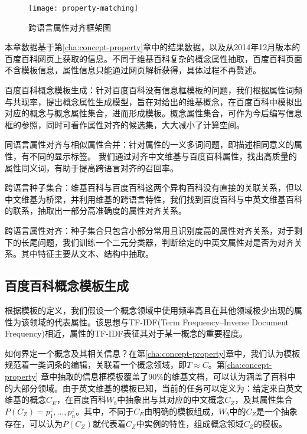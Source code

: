 \begin{figure}[h]
  \centering
  \texttt{[image: property-matching]}
  \caption{跨语言属性对齐框架图}
  \label{fig:property-matching}
\end{figure}

本章数据基于第\ref{cha:concept-property}章中的结果数据，以及从2014年12月版本的百度百科网页上获取的信息。不同于维基百科复杂的概念属性抽取，百度百科页面不含模板信息，属性信息只能通过网页解析获得，具体过程不再赘述。

{\heiti 百度百科概念模板生成：}针对百度百科没有信息框模板的问题，我们根据属性词频与共现率，提出概念属性生成模型，旨在对给出的维基概念，在百度百科中模拟出对应的概念与概念属性集合，进而形成模板。概念属性集合，可作为今后编写信息框的参照，同时可看作属性对齐的候选集，大大减小了计算空间。

{\heiti 同语言属性对齐与相似属性合并：}针对属性的一义多词问题，即描述相同意义的属性，有不同的显示标签。
我们通过对齐中文维基与百度百科属性，找出高质量的属性同义词，有助于提高跨语言对齐的召回率。

{\heiti 跨语言种子集合：}维基百科与百度百科这两个异构百科没有直接的关联关系，但以中文维基为桥梁，并利用维基的跨语言特性，我们找到百度百科与中英文维基百科的联系，抽取出一部分高准确度的属性对齐关系。

{\heiti 跨语言属性对齐：}种子集合只包含小部分常用且识别度高的属性对齐关系，对于剩下的长尾问题，我们训练一个二元分类器，判断给定的中英文属性对是否为对齐关系。其中特征主要从文本、结构中抽取。

\subsection{百度百科概念模板生成}
\label{sec:domain-template}
根据模板的定义，我们假设一个概念领域中使用频率高且在其他领域极少出现的属性为该领域的代表属性。该思想与TF-IDF(Term Frequency–Inverse Document Frequency)相近，属性的TF-IDF表征其对于某一概念的重要程度。

如何界定一个概念及其相关信息？在第\ref{cha:concept-property}章中，我们认为模板规范着一类词条的编辑，关联着一个概念领域，即$T \approx C$。第\ref{cha:concept-property} 章中抽取的信息框模板覆盖了90\%的维基文档，可以认为涵盖了百科中的大部分领域。由于英文维基的模板已知，当前的任务可以定义为：给定来自英文维基的概念$C_E$，在百度百科$W_b$中抽象出与其对应的中文概念$C_Z$，及其属性集合$P(C_Z)={p_1^z,...,p_n^z}$。其中，不同于$C_E$由明确的模板组成，$W_b$中的$C_Z$是一个抽象存在，可以认为$P(C_Z)$就代表着$C_Z$中实例的特性，组成概念领域$C_Z$的模板。

